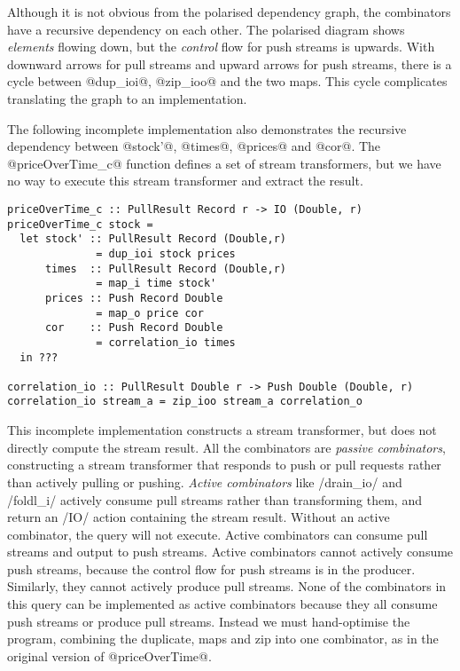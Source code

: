 Although it is not obvious from the polarised dependency graph, the combinators have a recursive dependency on each other.
The polarised diagram shows \emph{elements} flowing down, but the \emph{control} flow for push streams is upwards.
With downward arrows for pull streams and upward arrows for push streams, there is a cycle between @dup_ioi@, @zip_ioo@ and the two maps.
This cycle complicates translating the graph to an implementation.

The following incomplete implementation also demonstrates the recursive dependency between @stock'@, @times@, @prices@ and @cor@.
The @priceOverTime_c@ function defines a set of stream transformers, but we have no way to execute this stream transformer and extract the result.

\begin{lstlisting}
priceOverTime_c :: PullResult Record r -> IO (Double, r)
priceOverTime_c stock =
  let stock' :: PullResult Record (Double,r)
              = dup_ioi stock prices
      times  :: PullResult Record (Double,r)
              = map_i time stock'
      prices :: Push Record Double
              = map_o price cor
      cor    :: Push Record Double
              = correlation_io times
  in ???

correlation_io :: PullResult Double r -> Push Double (Double, r)
correlation_io stream_a = zip_ioo stream_a correlation_o
\end{lstlisting}

This incomplete implementation constructs a stream transformer, but does not directly compute the stream result.
All the combinators are \emph{passive combinators}, constructing a stream transformer that responds to push or pull requests rather than actively pulling or pushing.
\emph{Active combinators} like \Hs/drain_io/ and \Hs/foldl_i/ actively consume pull streams rather than transforming them, and return an \Hs/IO/ action containing the stream result.
Without an active combinator, the query will not execute.
Active combinators can consume pull streams and output to push streams.
Active combinators cannot actively consume push streams, because the control flow for push streams is in the producer.
Similarly, they cannot actively produce pull streams.
None of the combinators in this query can be implemented as active combinators because they all consume push streams or produce pull streams.
Instead we must hand-optimise the program, combining the duplicate, maps and zip into one combinator, as in the original version of @priceOverTime@.



